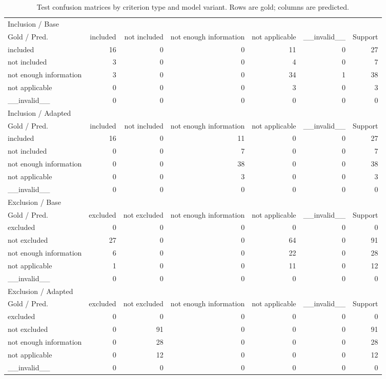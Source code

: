 \begin{table}[t]\centering\caption{Test confusion matrices by criterion type and model variant. Rows are gold; columns are predicted.}\scriptsize\begin{tabular}{lrrrrrr}\toprule
\multicolumn{7}{l}{Inclusion / Base} \\
Gold / Pred. & included & not included & not enough information & not applicable & \_\_invalid\_\_ & Support \\
\midrule
included & 16 & 0 & 0 & 11 & 0 & 27 \\
not included & 3 & 0 & 0 & 4 & 0 & 7 \\
not enough information & 3 & 0 & 0 & 34 & 1 & 38 \\
not applicable & 0 & 0 & 0 & 3 & 0 & 3 \\
\_\_invalid\_\_ & 0 & 0 & 0 & 0 & 0 & 0 \\
\multicolumn{7}{l}{Inclusion / Adapted} \\
Gold / Pred. & included & not included & not enough information & not applicable & \_\_invalid\_\_ & Support \\
\midrule
included & 16 & 0 & 11 & 0 & 0 & 27 \\
not included & 0 & 0 & 7 & 0 & 0 & 7 \\
not enough information & 0 & 0 & 38 & 0 & 0 & 38 \\
not applicable & 0 & 0 & 3 & 0 & 0 & 3 \\
\_\_invalid\_\_ & 0 & 0 & 0 & 0 & 0 & 0 \\
\multicolumn{7}{l}{Exclusion / Base} \\
Gold / Pred. & excluded & not excluded & not enough information & not applicable & \_\_invalid\_\_ & Support \\
\midrule
excluded & 0 & 0 & 0 & 0 & 0 & 0 \\
not excluded & 27 & 0 & 0 & 64 & 0 & 91 \\
not enough information & 6 & 0 & 0 & 22 & 0 & 28 \\
not applicable & 1 & 0 & 0 & 11 & 0 & 12 \\
\_\_invalid\_\_ & 0 & 0 & 0 & 0 & 0 & 0 \\
\multicolumn{7}{l}{Exclusion / Adapted} \\
Gold / Pred. & excluded & not excluded & not enough information & not applicable & \_\_invalid\_\_ & Support \\
\midrule
excluded & 0 & 0 & 0 & 0 & 0 & 0 \\
not excluded & 0 & 91 & 0 & 0 & 0 & 91 \\
not enough information & 0 & 28 & 0 & 0 & 0 & 28 \\
not applicable & 0 & 12 & 0 & 0 & 0 & 12 \\
\_\_invalid\_\_ & 0 & 0 & 0 & 0 & 0 & 0 \\
\bottomrule\end{tabular}\end{table}
